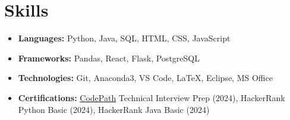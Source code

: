 \documentclass[letterpaper,11pt]{article}
\makeatletter
\newcommand{\resumeItem}[1]{
  \item\small{
    {#1 \vspace{-5pt}}
  }
}
\newcommand{\resumeSubheading}[4]{
  \vspace{-2pt}\item
    \begin{tabular*}{0.97\textwidth}[t]{l@{\extracolsep{\fill}}r@{\hspace{-0.2in}}}
        \textbf{#1} & #2 \\
        \textit{\small#3} & \textit{\small #4} \\
    \end{tabular*}\vspace{-7pt}
}
\newcommand{\resumeSubHeadingListStart}{\begin{itemize}[leftmargin=0.00in, rightmargin=-0.2in, label={}]}
\newcommand{\resumeItemListStart}{\begin{itemize}[leftmargin=0.15in, rightmargin=0.15in]}
\newcommand{\resumeItemListEnd}{\end{itemize}\vspace{-7pt}}
\makeatother
\begin{document}
\section{Skills}
    \vspace*{1pt}
    \begin{itemize}[itemsep=-0.05in, leftmargin=0.05in, label={}]
        \item \small{
            \textbf{Languages: } Python, Java, SQL, HTML, CSS, JavaScript
        }
        \item \small{
            \textbf{Frameworks: } Pandas, React, Flask, PostgreSQL
        }
        \item \small{
            \textbf{Technologies: } Git, Anaconda3, VS Code, LaTeX, Eclipse, MS Office
        }
        \item \small{
            \textbf{Certifications: } \href{https://www.codepath.org/}{\underline{CodePath}} Technical Interview Prep (2024), HackerRank Python Basic (2024), HackerRank Java Basic (2024)
        }
    \end{itemize}



\end{document}

